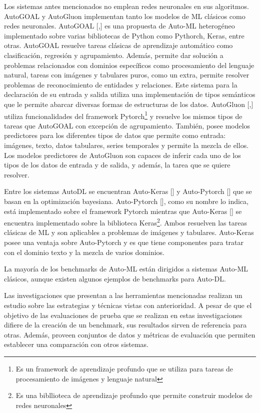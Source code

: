 Los sistemas antes mencionados no emplean redes neuronales en sus algoritmos. AutoGOAL y AutoGluon implementan tanto los modelos de ML clásicos como redes 
neuronales. AutoGOAL [\cite{40},\cite{41}] es una propuesta de Auto-ML heterogéneo implementado sobre varias bibliotecas de Python como Pythorch, Keras, entre otras. 
AutoGOAL resuelve tareas clásicas de aprendizaje automático como clasificación, regresión y 
agrupamiento. Además, permite dar solución a problemas relacionados con dominios específicos como procesamiento del lenguaje natural, tareas con imágenes y tabulares puros, como un extra, 
permite resolver problemas de reconocimiento de entidades y relaciones. Este sistema para la declaración de su entrada y salida utiliza una implementación de tipos semánticos que le permite abarcar diversas 
formas de estructuras de los datos.
AutoGluon [\cite{17},\cite{42}] utiliza funcionalidades del framework Pytorch\footnote{Es un framework de aprendizaje 
profundo que se utiliza para tareas de procesamiento de imágenes y lenguaje natural} y resuelve los mismos tipos de tareas que AutoGOAL con excepción de agrupamiento. 
También, posee modelos predictores para los diferentes 
tipos de datos que permite como entrada: imágenes, texto, datos tabulares, series temporales y permite la mezcla de ellos. Los modelos predictores de AutoGluon 
son capaces de inferir cada uno de los tipos de los datos de entrada y de salida, y además, la tarea que se quiere resolver. 

Entre los sistemas AutoDL se encuentran Auto-Keras [\cite{13}] y Auto-Pytorch [\cite{21}] que se basan en la optimización bayesiana. 
Auto-Pytorch [\cite{21}], como su nombre lo indica, está implementado sobre el framework Pytorch mientras que Auto-Keras [\cite{13}] se encuentra implementado sobre la 
biblioteca Keras\footnote{Es una bibllioteca de aprendizaje profundo que permite construir modelos de redes neuronales}. Ambos resuelven las tareas clásicas de ML y son aplicables a problemas de imágenes y tabulares. Auto-Keras posee una ventaja sobre Auto-Pytorch y 
es que tiene componentes para tratar con el dominio texto y la mezcla de varios dominios.

La mayoría de los benchmarks de Auto-ML están dirigidos a sistemas Auto-ML clásicos, aunque existen algunos ejemplos de benchmarks para Auto-DL. 

Las investigaciones que presentan a las herramientas mencionadas realizan un estudio sobre las estrategias y técnicas vistas con anterioridad.
A pesar de que el objetivo de las evaluaciones de prueba que se realizan en estas investigaciones difiere de la creación de un benchmark, sus resultados sirven de 
referencia para otras. Además, proveen conjuntos de datos y métricas de evaluación que permiten establecer una comparación con otros sistemas.

